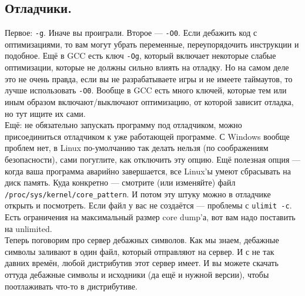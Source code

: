 \documentclass{article}
\begin{document}
    \subsection{Отладчики.}
    Первое: \texttt{-g}. Иначе вы проиграли. Второе --- \texttt{-O0}. Если дебажить код с оптимизациями, то вам могут убрать переменные, переупорядочить инструкции и подобное. Ещё в GCC есть ключ \texttt{-Og}, который включает некоторые слабые оптимизации, которые не должны сильно влиять на отладку. Но на самом деле это не очень правда, если вы не разрабатываете игры и не имеете таймаутов, то лучше использовать \texttt{-O0}. Вообще в GCC есть много ключей, которые тем или иным образом включают/выключают оптимизацию, от которой зависит отладка, но тут ищите их сами.\\
    Ещё: не обязательно запускать программу под отладчиком, можно присоединиться отладчиком к уже работающей программе. С Windows вообще проблем нет, в Linux по-умолчанию так делать нельзя (по соображениям безопасности), сами погуглите, как отключить эту опцию. Ещё полезная опция --- когда ваша программа аварийно завершается, все Linux'ы умеют сбрасывать на диск память. Куда конкретно --- смотрите (или изменяйте) файл \texttt{/proc/sys/kernel/core_pattern}. И потом эту штуку можно в отладчике открыть и посмотреть. Если файл у вас не создаётся --- проблемы с \texttt{ulimit -c}. Есть ограничения на максимальный размер core dump'а, вот вам надо поставить на unlimited.\\
    Теперь поговорим про сервер дебажных символов. Как мы знаем, дебажные символы заливают в один файл, который отправляют на сервер. И с не так давних времён, любой дистрибутив этот сервер имеет. И вы можете скачать оттуда дебажные символы и исходники (да ещё и нужной версии), чтобы поотлаживать что-то в дистрибутиве.
\end{document}
